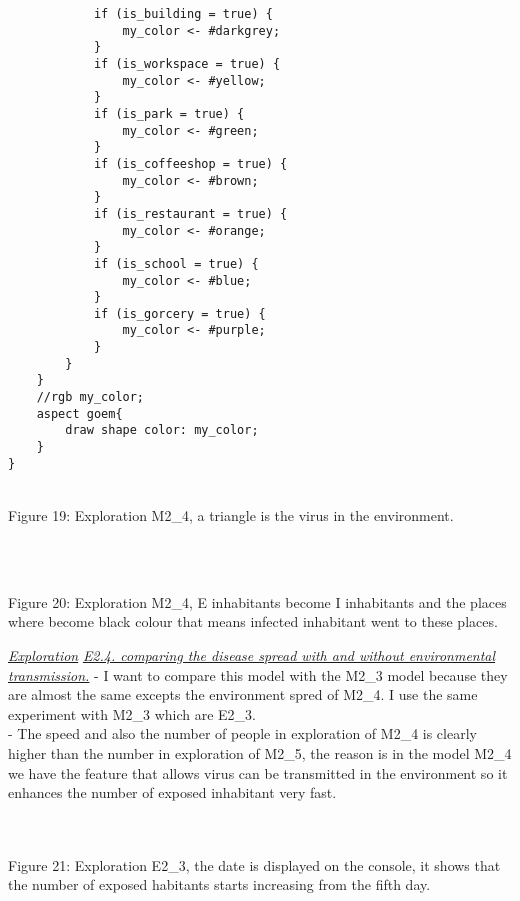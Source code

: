 \documentclass{article}
\begin{document}
\begin{pic15}
\begin{pic15}
\begin{tcolorbox}
\begin{lstlisting}
			if (is_building = true) {
				my_color <- #darkgrey;
			}			
			if (is_workspace = true) {
				my_color <- #yellow;
			}	
			if (is_park = true) {
				my_color <- #green;
			}	
			if (is_coffeeshop = true) {
				my_color <- #brown;
			}	
			if (is_restaurant = true) {
				my_color <- #orange;
			}			
			if (is_school = true) {
				my_color <- #blue;
			}
			if (is_gorcery = true) {
				my_color <- #purple;
			}
		}
	}
	//rgb my_color;
	aspect goem{
		draw shape color: my_color;
	}
}
\end{lstlisting}
\end{tcolorbox}
\newline\newline

\begin{pic19}
\\
\caption{Figure 19: Exploration M2\_4, a triangle is the virus in the environment.} 
\end{pic19}
\\
\begin{pic20}
\\
\caption{Figure 20: Exploration M2\_4, E inhabitants become I inhabitants and the places where become black colour that means infected inhabitant went to these places.} 
\end{pic20}
\newpage
\underline{\emph{Exploration}}
\newline\newline
\underline{\textit{E2.4. comparing the disease spread with and without environmental transmission.}}
\newline\newline
- I want to compare this model with the M2\_3 model because they are almost the same excepts the environment spred of M2\_4. I use the same experiment with M2\_3 which are E2\_3.
\\- The speed and also the number of people in exploration of M2\_4 is clearly higher than the number in exploration of M2\_5, the reason is in the model M2\_4 we have the feature that allows virus can be transmitted in the environment so it enhances the number of exposed inhabitant very fast.
\\\\
\begin{pic21}
\\
\caption{Figure 21: Exploration E2\_3, the date is displayed on the console, it shows that the number of exposed habitants starts increasing from the fifth day.} 

\end{pic21}
\end{pic15}
\end{pic15}
\end{document}
